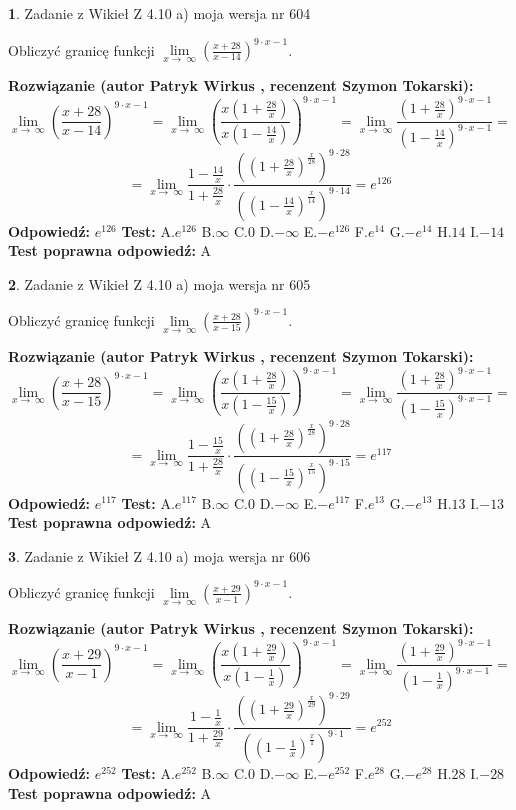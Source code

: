 \documentclass[12pt, a4paper]{article}
\theoremstyle{definition} %
\newtheorem{zad}{}
\newcommand{\zadStart}[1]{\begin{zad}#1\newline}
\newcommand{\zadStop}{\end{zad}}
\newcommand{\rozwStart}[2]{\noindent \textbf{Rozwiązanie (autor #1 , recenzent #2): }\newline}
\newcommand{\rozwStop}{\newline}
\newcommand{\odpStart}{\noindent \textbf{Odpowiedź:}\newline}
\newcommand{\odpStop}{\newline}
\newcommand{\testStart}{\noindent \textbf{Test:}\newline}
\newcommand{\testStop}{\newline}
\newcommand{\kluczStart}{\noindent \textbf{Test poprawna odpowiedź:}\newline}
\newcommand{\kluczStop}{\newline}
\begin{document}
\zadStart{Zadanie z Wikieł Z 4.10 a) moja wersja nr 604}

Obliczyć granicę funkcji  $\lim\limits_{x\to\ \infty}(\frac{x+28}{x-14})^{9\cdot x-1}$.
\zadStop
\rozwStart{Patryk Wirkus}{Szymon Tokarski}
$$\lim\limits_{x\to\ \infty}(\frac{x+28}{x-14})^{9\cdot x-1} = \lim\limits_{x\to\ \infty}(\frac{x(1+\frac{28}{x})}{x(1-\frac{14}{x})})^{9\cdot x-1}=\lim\limits_{x\to\ \infty}\frac{(1+\frac{28}{x})^{9\cdot x-1}}{(1-\frac{14}{x})^{9\cdot x-1}}=$$
$$=\lim\limits_{x\to\ \infty}\frac{1-\frac{14}{x}}{1+\frac{28}{x}}\cdot\frac{((1+\frac{28}{x})^{\frac{x}{28}})^{9\cdot28}}{((1-\frac{14}{x})^{\frac{x}{14}})^{9\cdot14}}=e^{126}$$
\rozwStop
\odpStart
$e^{126}$
\odpStop
\testStart
A.$e^{126}$ B.$\infty$ C.$0$ D.$-\infty$ E.$-e^{126}$
F.$e^{14}$ G.$-e^{14}$
H.$14$
I.$-14$
\testStop
\kluczStart
A
\kluczStop



\zadStart{Zadanie z Wikieł Z 4.10 a) moja wersja nr 605}

Obliczyć granicę funkcji  $\lim\limits_{x\to\ \infty}(\frac{x+28}{x-15})^{9\cdot x-1}$.
\zadStop
\rozwStart{Patryk Wirkus}{Szymon Tokarski}
$$\lim\limits_{x\to\ \infty}(\frac{x+28}{x-15})^{9\cdot x-1} = \lim\limits_{x\to\ \infty}(\frac{x(1+\frac{28}{x})}{x(1-\frac{15}{x})})^{9\cdot x-1}=\lim\limits_{x\to\ \infty}\frac{(1+\frac{28}{x})^{9\cdot x-1}}{(1-\frac{15}{x})^{9\cdot x-1}}=$$
$$=\lim\limits_{x\to\ \infty}\frac{1-\frac{15}{x}}{1+\frac{28}{x}}\cdot\frac{((1+\frac{28}{x})^{\frac{x}{28}})^{9\cdot28}}{((1-\frac{15}{x})^{\frac{x}{15}})^{9\cdot15}}=e^{117}$$
\rozwStop
\odpStart
$e^{117}$
\odpStop
\testStart
A.$e^{117}$ B.$\infty$ C.$0$ D.$-\infty$ E.$-e^{117}$
F.$e^{13}$ G.$-e^{13}$
H.$13$
I.$-13$
\testStop
\kluczStart
A
\kluczStop



\zadStart{Zadanie z Wikieł Z 4.10 a) moja wersja nr 606}

Obliczyć granicę funkcji  $\lim\limits_{x\to\ \infty}(\frac{x+29}{x-1})^{9\cdot x-1}$.
\zadStop
\rozwStart{Patryk Wirkus}{Szymon Tokarski}
$$\lim\limits_{x\to\ \infty}(\frac{x+29}{x-1})^{9\cdot x-1} = \lim\limits_{x\to\ \infty}(\frac{x(1+\frac{29}{x})}{x(1-\frac{1}{x})})^{9\cdot x-1}=\lim\limits_{x\to\ \infty}\frac{(1+\frac{29}{x})^{9\cdot x-1}}{(1-\frac{1}{x})^{9\cdot x-1}}=$$
$$=\lim\limits_{x\to\ \infty}\frac{1-\frac{1}{x}}{1+\frac{29}{x}}\cdot\frac{((1+\frac{29}{x})^{\frac{x}{29}})^{9\cdot29}}{((1-\frac{1}{x})^{\frac{x}{1}})^{9\cdot1}}=e^{252}$$
\rozwStop
\odpStart
$e^{252}$
\odpStop
\testStart
A.$e^{252}$ B.$\infty$ C.$0$ D.$-\infty$ E.$-e^{252}$
F.$e^{28}$ G.$-e^{28}$
H.$28$
I.$-28$
\testStop
\kluczStart
A
\kluczStop
\end{document}
